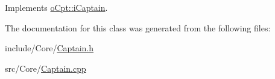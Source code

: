 Implements \hyperlink{classo_cpt_1_1i_captain_aeda385ea9a0ee33301dfda05098c836b}{o\+Cpt\+::i\+Captain}.



The documentation for this class was generated from the following files\+:\begin{DoxyCompactItemize}
\item 
include/\+Core/\hyperlink{_captain_8h}{Captain.\+h}\item 
src/\+Core/\hyperlink{_captain_8cpp}{Captain.\+cpp}\end{DoxyCompactItemize}
